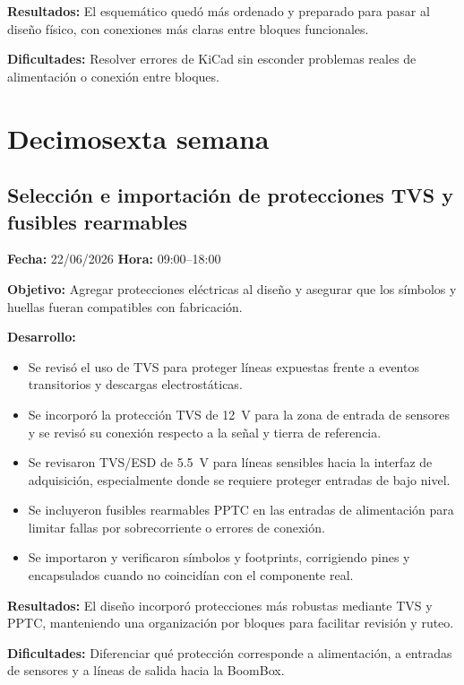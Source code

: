 \documentclass[12pt]{article}
\begin{document}
\textbf{Resultados:}
El esquemático quedó más ordenado y preparado para pasar al diseño físico, con conexiones más claras entre bloques funcionales.

\textbf{Dificultades:}
Resolver errores de KiCad sin esconder problemas reales de alimentación o conexión entre bloques.

\section{Decimosexta semana}

\subsection{Selección e importación de protecciones TVS y fusibles rearmables}
\textbf{Fecha:} 22/06/2026 \quad \textbf{Hora:} 09:00--18:00

\textbf{Objetivo:}
Agregar protecciones eléctricas al diseño y asegurar que los símbolos y huellas fueran compatibles con fabricación.

\textbf{Desarrollo:}
\begin{itemize}
\item Se revisó el uso de TVS para proteger líneas expuestas frente a eventos transitorios y descargas electrostáticas.
\item Se incorporó la protección TVS de \SI{12}{V} para la zona de entrada de sensores y se revisó su conexión respecto a la señal y tierra de referencia.
\item Se revisaron TVS/ESD de \SI{5.5}{V} para líneas sensibles hacia la interfaz de adquisición, especialmente donde se requiere proteger entradas de bajo nivel.
\item Se incluyeron fusibles rearmables PPTC en las entradas de alimentación para limitar fallas por sobrecorriente o errores de conexión.
\item Se importaron y verificaron símbolos y footprints, corrigiendo pines y encapsulados cuando no coincidían con el componente real.
\end{itemize}

\textbf{Resultados:}
El diseño incorporó protecciones más robustas mediante TVS y PPTC, manteniendo una organización por bloques para facilitar revisión y ruteo.

\textbf{Dificultades:}
Diferenciar qué protección corresponde a alimentación, a entradas de sensores y a líneas de salida hacia la BoomBox.
\end{document}
